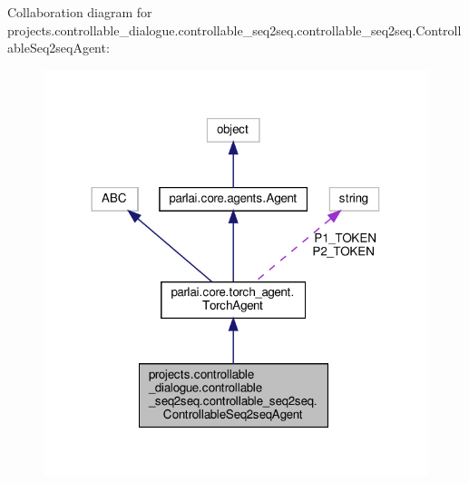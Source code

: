 Collaboration diagram for projects.\+controllable\+\_\+dialogue.\+controllable\+\_\+seq2seq.\+controllable\+\_\+seq2seq.\+Controllable\+Seq2seq\+Agent\+:
\nopagebreak
\begin{figure}[H]
\begin{center}
\leavevmode
\includegraphics[width=318pt]{de/d6e/classprojects_1_1controllable__dialogue_1_1controllable__seq2seq_1_1controllable__seq2seq_1_1Con19d93f1a2a924e8b6c8b2d9d045183f4}
\end{center}
\end{figure}
